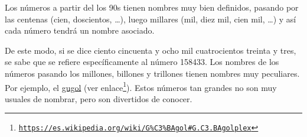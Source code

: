 Los números a partir del los 90s tienen nombres muy bien definidos, pasando por las centenas (cien, doscientos, \dots), luego millares (mil, diez mil, cien mil, \dots) y así cada número tendrá un nombre asociado. 

De este modo, si se dice ciento cincuenta y ocho mil cuatrocientos treinta y tres, se sabe que se refiere específicamente al número 158433. Los nombres de los números pasando los millones, billones y trillones tienen nombres muy peculiares. Por ejemplo, el \href{https://es.wikipedia.org/wiki/G\%C3\%BAgol\#G.C3.BAgolplex}{gugol} (ver enlace\footnote{\href{https://es.wikipedia.org/wiki/G\%C3\%BAgol\#G.C3.BAgolplex}{\texttt{https://es.wikipedia.org/wiki/G\%C3\%BAgol\#G.C3.BAgolplex}}}). Estos números tan grandes no son muy usuales de nombrar, pero son divertidos de conocer.
